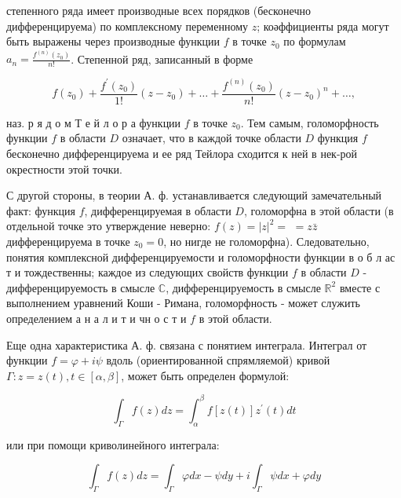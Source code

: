 \documentclass[10pt]{article}
\begin{document}
степенного ряда имеет производные всех порядков (бесконечно дифференцируема) по комплексному переменному $z$; коәффициенты ряда могут быть выражены через производные функции $f$ в точке $z_{0}$ по формулам $a_{n}=\frac{f^{(n)}\left(z_{0}\right)}{n !}$. Степенной ряд, записанный в форме



\[

f\left(z_{0}\right)+\frac{f^{\prime}\left(z_{0}\right)}{1 !}\left(z-z_{0}\right)+\ldots+\frac{f^{(n)}\left(z_{0}\right)}{n !}\left(z-z_{0}\right)^{n}+\ldots,

\]



наз. р я д о м Т е й л о р а функции $f$ в точке $z_{0}$. Тем самым, голоморфность функции $f$ в области $D$ означает, что в каждой точке области $D$ функция $f$ бесконечно дифференцируема и ее ряд Тейлора сходится к ней в нек-рой окрестности этой точки.



С другой стороны, в теории А. ф. устанавливается следующий замечательный факт: функция $f$, дифференцируемая в области $D$, голоморфна в этой области (в отдельной точке это утверждение неверно: $f(z)=|z|^{2}=$ $=z \bar{z}$ дифференцируема в точке $z_{0}=0$, но нигде не голоморфна). Следовательно, понятия комплексной дифференцируемости и голоморфности функции в о б л ас т и тождественны; каждое из следующих свойств функции $f$ в области $D$ - дифференцируемость в смысле $\mathbb{C}$, дифференцируемость в смысле $\mathbb{R}^{2}$ вместе с выполнением уравнений Коши - Римана, голоморфность - может служить определением а н а л и т и чн о с т и $f$ в этой области.



Еще одна характеристика А. ф. связана с понятием интеграла. Интеграл от функции $f=\varphi+i \psi$ вдоль (ориентированной спрямляемой) кривой $\Gamma: z=z(t), t \in[\alpha, \beta]$, может быть определен формулой:



\[

\int_{\Gamma} f(z) d z=\int_{\alpha}^{\beta} f[z(t)] z^{\prime}(t) d t

\]



или при помощи криволинейного интеграла:



\[

\int_{\Gamma} f(z) d z=\int_{\Gamma} \varphi d x-\psi d y+i \int_{\Gamma} \psi d x+\varphi d y

\]
\end{document}
